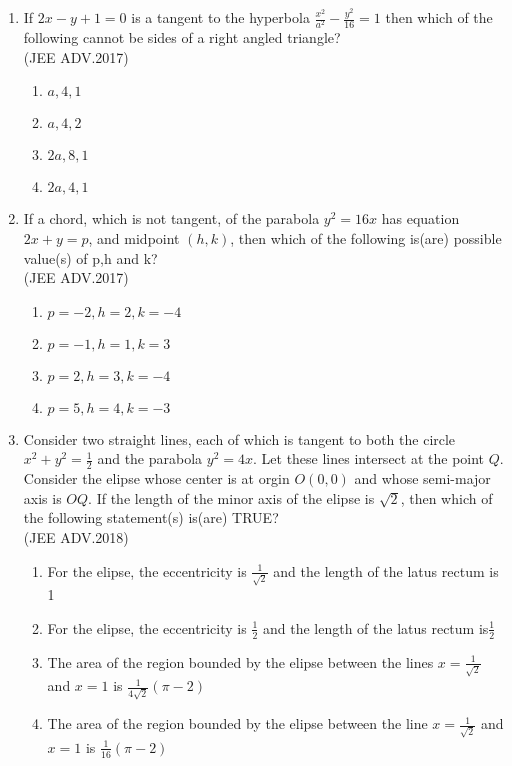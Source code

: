 \documentclass[journal,12pt,twocolumn]{IEEEtran}
\theoremstyle{remark}
\begin{document}
\begin{enumerate}
\begin{enumerate}
	      \end{enumerate}
      \item If $2x-y+1=0$ is a tangent to the hyperbola $\frac{x^2}{a^2}-\frac{y^2}{16}=1$ then which of the following cannot be sides of a right angled triangle? \\
	      \hfill(JEE ADV.2017)
	      \\
	      \begin{enumerate}
		      \item $a,4,1$
		      \item $a,4,2$
		      \item $2a,8,1$
		      \item $2a,4,1$
	      \end{enumerate}
      \item If a chord, which is not tangent, of the parabola $y^2=16x$ has equation $2x+y=p$, and midpoint $(h,k)$, then which of the following is(are) possible value(s) of p,h and k? \\
	      \hfill(JEE ADV.2017)
	      \\
	      \begin{enumerate}
		      \item $p=-2,h=2,k=-4$
		      \item $p=-1,h=1,k=3$
		      \item $p=2,h=3,k=-4$
		      \item $p=5,h=4,k=-3$


	      \end{enumerate}
      \item Consider two straight lines, each of which is tangent to both the circle $x^2+y^2=\frac{1}{2}$
	      and the parabola $y^2=4x$. Let these lines intersect at the point $Q$. Consider the elipse whose center is at orgin $O(0,0)$ and whose semi-major axis is $OQ$.
	      If the length of the minor axis of the elipse is $\sqrt{2}$, then which of the following statement(s) is(are) TRUE? \\
	      \hfill(JEE ADV.2018)
	      \\
	      \begin{enumerate}
		      \item For the elipse, the eccentricity is $\frac{1}{\sqrt{2}}$ and the length of the latus rectum is 1

		      \item For the elipse, the eccentricity is $\frac{1}{2}$ and the length of the latus rectum is$\frac{1}{2}$
		      \item The area of the region bounded by the elipse between the lines $x=\frac{1}{\sqrt{2}}$ and $x=1$ is $\frac{1}{4\sqrt{2}}(\pi-2)$
		      \item The area of the region bounded by the elipse between the line $x=\frac{1}{\sqrt{2}}$ and $x=1$ is $\frac{1}{16}(\pi-2)$
	      \end{enumerate}

\end{enumerate}
\end{document}
